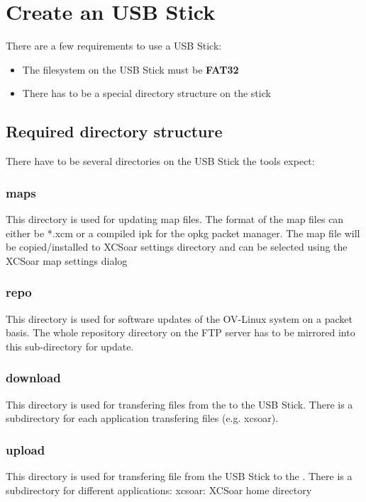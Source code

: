 \section{Create an USB Stick}

There are a few requirements to use a USB Stick:
\begin{itemize}
	\item The filesystem on the USB Stick must be \textbf{FAT32}
	\item There has to be a special directory structure on the stick
\end{itemize}

\subsection{Required directory structure}
There have to be several directories on the USB Stick the tools expect:


\subsubsection{maps}
This directory is used for updating map files. 
The format of  the map files can either be *.xcm or a compiled ipk for the opkg packet manager.
The map file will be copied/installed to XCSoar settings directory and can be selected using the XCSoar map settings dialog

\subsubsection{repo}
This directory is used for software updates of the OV-Linux system on a packet basis.
The whole repository directory on the FTP server has to be mirrored into this sub-directory for update.

\subsubsection{download}
This directory is used for transfering files from the \ovfc to the USB Stick. There is a subdirectory for each application transfering files (e.g. xcsoar).

\subsubsection{upload}
This directory is used for transfering file from the USB Stick to the \ovfc.
There is a subdirectory for different applications:
xcsoar: XCSoar home directory

